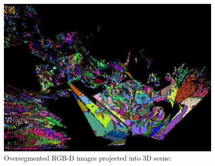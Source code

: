 \documentclass[10pt,letterpaper]{article}
\begin{document}
\begin{figure}[ht]
\begin{center}
	\includegraphics[width=.4\linewidth]{OverSegmented3.png}
\end{center}
\caption{Oversegmented RGB-D images projected into 3D scene.}
\label{fig:overseg3}
\end{figure}
\end{document}
